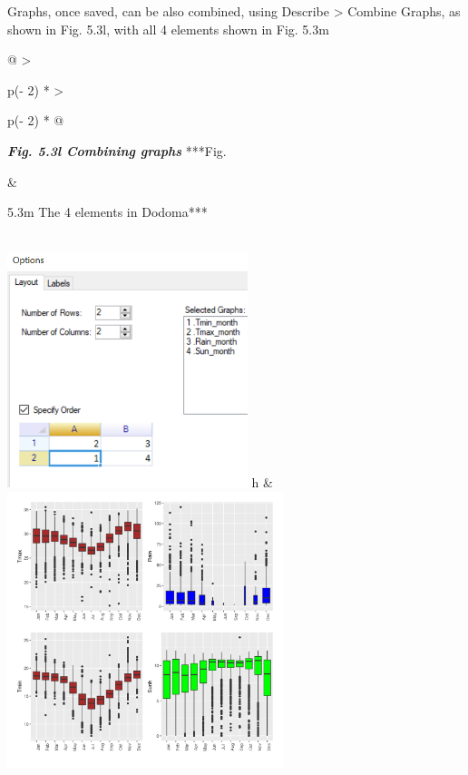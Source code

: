 \documentclass[
  letterpaper,
  DIV=11,
  numbers=noendperiod]{scrreprt}
\begin{document}
Graphs, once saved, can be also combined, using Describe \textgreater{}
Combine Graphs, as shown in Fig. 5.3l, with all 4 elements shown in Fig.
5.3m

\begin{longtable}[]{@{}
  >{\raggedright\arraybackslash}p{(\columnwidth - 2\tabcolsep) * }
  >{\raggedright\arraybackslash}p{(\columnwidth - 2\tabcolsep) * }@{}}
\toprule\noalign{}
\begin{minipage}[b]{\linewidth}\raggedright
\textbf{\emph{Fig. 5.3l Combining graphs}} ***Fig.
\end{minipage} & \begin{minipage}[b]{\linewidth}\raggedright
5.3m The 4 elements in Dodoma***
\end{minipage} \\
\midrule\noalign{}
\endhead
\bottomrule\noalign{}
\endlastfoot
\includegraphics[width=2.7585in,height=2.70783in]{figures/Fig5.3l.png} h
&
\includegraphics[width=3.16667in,height=\textheight]{figures/Fig5.3m.png} \\
\end{longtable}
\end{document}
